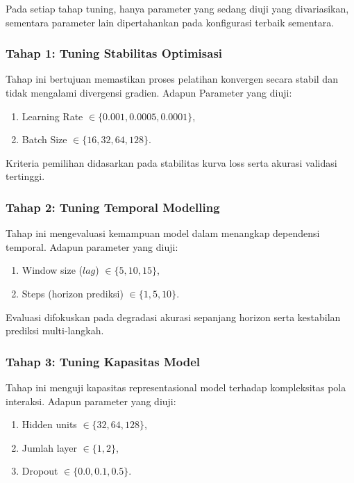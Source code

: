 \noindent
Pada setiap tahap tuning, hanya parameter yang sedang diuji yang divariasikan, sementara parameter lain dipertahankan pada konfigurasi terbaik sementara.

\subsubsection{Tahap 1: Tuning Stabilitas Optimisasi}

Tahap ini bertujuan memastikan proses pelatihan konvergen secara stabil dan tidak mengalami divergensi gradien. Adapun Parameter yang diuji:

\begin{enumerate}
    \item Learning Rate $\in \{0.001, 0.0005, 0.0001\}$,
    \item Batch Size $\in \{16, 32, 64, 128\}$.
\end{enumerate}

\noindent
Kriteria pemilihan didasarkan pada stabilitas kurva loss serta akurasi validasi tertinggi.

\subsubsection{Tahap 2: Tuning Temporal Modelling}

Tahap ini mengevaluasi kemampuan model dalam menangkap dependensi temporal. Adapun parameter yang diuji:

\begin{enumerate}
    \item Window size ($lag$) $\in \{5, 10, 15\}$,
    \item Steps (horizon prediksi) $\in \{1, 5, 10\}$.
\end{enumerate}

\noindent
Evaluasi difokuskan pada degradasi akurasi sepanjang horizon serta kestabilan prediksi multi-langkah.

\subsubsection{Tahap 3: Tuning Kapasitas Model}

Tahap ini menguji kapasitas representasional model terhadap kompleksitas pola interaksi. Adapun parameter yang diuji:

\begin{enumerate}
    \item Hidden units $\in \{32, 64, 128\}$,
    \item Jumlah layer $\in \{1, 2\}$,
    \item Dropout $\in \{0.0, 0.1, 0.5\}$.
\end{enumerate}


